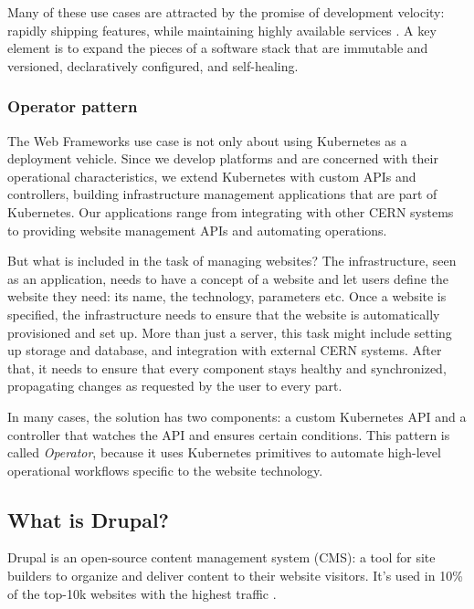 Many of these use cases are attracted by the promise of development velocity:
rapidly shipping features, while maintaining highly available services \cite{hightower_kubernetes_2017}.
A key element is to expand the pieces of a software stack that are immutable and versioned, declaratively configured, and self-healing.

\subsubsection*{Operator pattern}
\label{sec-operators}

The Web Frameworks use case is not only about using Kubernetes as a deployment vehicle.
Since we develop platforms and are concerned with their operational characteristics,
we extend Kubernetes with custom APIs and controllers, building infrastructure management applications that are part of Kubernetes.
Our applications range from integrating with other CERN systems to providing website management APIs and automating operations.

But what is included in the task of managing websites?
The infrastructure, seen as an application, needs to have a concept of a website and let users define the website they need: its name, the technology, parameters etc.
Once a website is specified, the infrastructure needs to ensure that the website is automatically provisioned and set up.
More than just a server, this task might include setting up storage and database, and integration with external CERN systems.
After that, it needs to ensure that every component stays healthy and synchronized, propagating changes as requested by the user to every part.

In many cases, the solution has two components: a custom Kubernetes API and a controller that watches the API and ensures certain conditions.
This pattern is called \emph{Operator}, because it uses Kubernetes primitives to automate high-level operational workflows specific to the website technology.

\subsection{What is Drupal?}
\label{what-is-drupal}

Drupal is an open-source content management system (CMS): a tool for site builders to organize and deliver content to their website visitors.
It's used in 10\% of the top-10k websites with the highest traffic \cite{builtwith_pty_ltd_open_nodate,q-success_di_gelbmann_gmbh_wordpress_nodate}.

